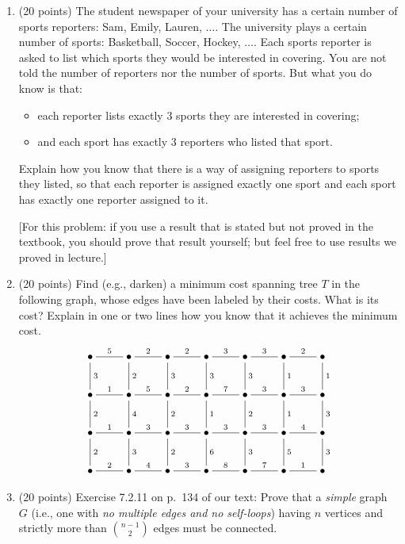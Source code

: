 \documentclass[11pt]{article}
\begin{document}
\begin{enumerate}
\pagebreak

\item (20 points) The student newspaper of your university has a certain number of sports reporters: Sam, Emily, Lauren, $\ldots$. The university plays a certain number of sports: Basketball, Soccer, Hockey, $\ldots$. Each sports reporter is asked to list which sports they would be interested in covering. You are not told the number of reporters nor the number of sports. But what you do know is that: \begin{itemize} \item each reporter lists exactly 3 sports they are interested in covering; \item and each sport has exactly 3 reporters who listed that sport. \end{itemize} Explain how you know that there is a way of assigning reporters to sports they listed, so that each reporter is assigned exactly one sport and each sport has exactly one reporter assigned to it. 

[For this problem: if you use a result that is stated but not proved in the textbook, you should prove that result yourself; but feel free to use results we proved in lecture.]

\item (20 points) Find (e.g., darken) a minimum cost spanning tree $T$ in the following graph, whose edges have been labeled by their costs. What is its cost? Explain in one or two lines how you know that it achieves the minimum cost.
\[ \xymatrix{
\bullet \ar@{-}[r]^5 \ar@{-}[d]^3 & \bullet  \ar@{-}[r]^2  \ar@{-}[d]^2 & \bullet  \ar@{-}[r]^2  \ar@{-}[d]^3 & \bullet  \ar@{-}[r]^3  \ar@{-}[d]^3 & \bullet  \ar@{-}[r]^3  \ar@{-}[d]^3 & \bullet  \ar@{-}[r]^2  \ar@{-}[d]^1 &  \ar@{-}[d]^1 \bullet \\
\bullet \ar@{-}[r]^1 \ar@{-}[d]^2 & \bullet  \ar@{-}[r]^5  \ar@{-}[d]^4 & \bullet  \ar@{-}[r]^2  \ar@{-}[d]^2 & \bullet  \ar@{-}[r]^7  \ar@{-}[d]^1 & \bullet  \ar@{-}[r]^3  \ar@{-}[d]^2 & \bullet  \ar@{-}[r]^3  \ar@{-}[d]^1 &  \ar@{-}[d]^3 \bullet \\
\bullet \ar@{-}[r]^1 \ar@{-}[d]^2 & \bullet  \ar@{-}[r]^3  \ar@{-}[d]^3 & \bullet  \ar@{-}[r]^3  \ar@{-}[d]^2 & \bullet  \ar@{-}[r]^3  \ar@{-}[d]^6 & \bullet  \ar@{-}[r]^3  \ar@{-}[d]^3 & \bullet  \ar@{-}[r]^4  \ar@{-}[d]^5 &  \ar@{-}[d]^3 \bullet \\
\bullet \ar@{-}[r]^2 & \bullet  \ar@{-}[r]^4 & \bullet  \ar@{-}[r]^3 & \bullet  \ar@{-}[r]^8 & \bullet  \ar@{-}[r]^7 & \bullet  \ar@{-}[r]^1 & \bullet
} \]

\item (20 points) Exercise 7.2.11 on p.~134 of our text: Prove that a \emph{simple} graph $G$ (i.e., one with \emph{no multiple edges and no self-loops}) having $n$ vertices and strictly more than $\binom{n-1}{2}$ edges must be connected.

\end{enumerate}
\end{document}
